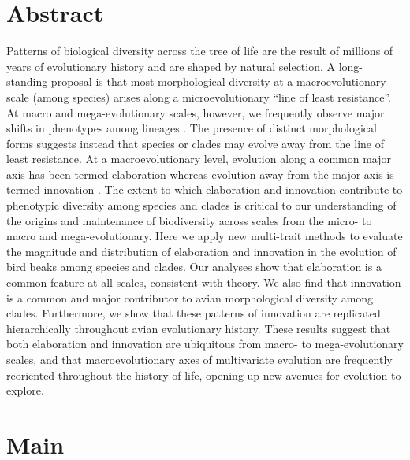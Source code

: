 \documentclass[12pt,letterpaper]{article}
\begin{document}
\section{Abstract}

Patterns of biological diversity across the tree of life are the result of millions of years of evolutionary history and are shaped by natural selection.
A long-standing proposal is that most morphological diversity at a macroevolutionary scale (among species) arises along a microevolutionary ``line of least resistance''. At macro and mega-evolutionary scales, however, we frequently observe major shifts in phenotypes among lineages \cite{venditti2011multiple, pagel2022general}. The presence of distinct morphological forms suggests instead that species or clades may evolve away from the line of least resistance. At a macroevolutionary level, evolution along a common major axis has been termed elaboration whereas evolution away from the major axis is termed innovation \cite{endler2005animal, renaud2006conserved}. The extent to which elaboration and innovation contribute to phenotypic diversity among species and clades is critical to our understanding of the origins and maintenance of biodiversity across scales from the micro- to macro and mega-evolutionary. Here we apply new multi-trait methods to evaluate the magnitude and distribution of elaboration and innovation in the evolution of bird beaks among species and clades. Our analyses show that elaboration is a common feature at all scales, consistent with theory.
We also find that innovation is a common and major contributor to avian morphological diversity among clades.
Furthermore, we show that these patterns of innovation are replicated hierarchically throughout avian evolutionary history.
These results suggest that both elaboration and innovation are ubiquitous from macro- to mega-evolutionary scales, and that macroevolutionary axes of multivariate evolution are frequently reoriented throughout the history of life, opening up new avenues for evolution to explore.



\section{Main}
\end{document}
